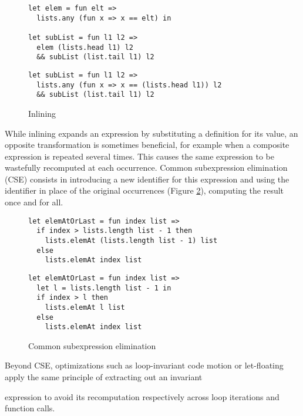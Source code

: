 \documentclass[sigplan,10pt,review,anonymous]{acmart}
\newcommand{\unsure}[2][1=]{}
\newcommand{\info}[2][1=]{}
\begin{document}
\info{I think it's better to use [h] on figures, we can discuss it}
\begin{figure}[h]
  \begin{center}
\begin{lstlisting}[language=nickel,title={Source program}]
let elem = fun elt =>
  lists.any (fun x => x == elt) in

let subList = fun l1 l2 =>
  elem (lists.head l1) l2
  && subList (list.tail l1) l2
\end{lstlisting}
\begin{lstlisting}[language=nickel,title={Optimized program}]
let subList = fun l1 l2 =>
  lists.any (fun x => x == (lists.head l1)) l2
  && subList (list.tail l1) l2
\end{lstlisting}
  \end{center}
\caption{Inlining}
\label{fig:optimizations-inlining-ex}
\end{figure}

While inlining expands an expression by substituting a definition for its value,
an opposite transformation is sometimes beneficial, for example when a composite
expression is repeated several times. This causes the same expression to be
wastefully recomputed at each occurrence. Common subexpression elimination (CSE)
consists in introducing a new identifier for this expression and using the
identifier in place of the original occurrences
(Figure \ref{fig:optimizations-cse-ex}), computing the result once and for all.

\begin{figure}[h]
  \begin{center}
\begin{lstlisting}[language=nickel,title={Source program}]
let elemAtOrLast = fun index list =>
  if index > lists.length list - 1 then
    lists.elemAt (lists.length list - 1) list
  else
    lists.elemAt index list
\end{lstlisting}
\begin{lstlisting}[language=nickel,title={Optimized program}]
let elemAtOrLast = fun index list =>
  let l = lists.length list - 1 in
  if index > l then
    lists.elemAt l list
  else
    lists.elemAt index list
\end{lstlisting}
  \end{center}
\caption{Common subexpression elimination}
\label{fig:optimizations-cse-ex}
\end{figure}

Beyond CSE, optimizations such as loop-invariant code motion or
let-floating~\cite{letFloating} apply the same principle of extracting out an invariant
\unsure{Was this the inteded citation?}
expression to avoid its recomputation respectively across loop iterations and
function calls.
\end{document}
